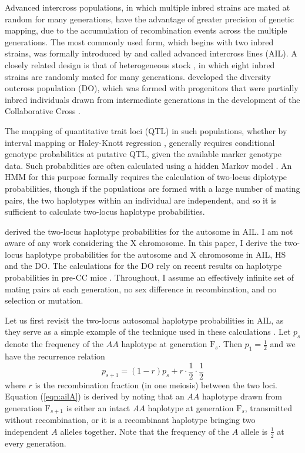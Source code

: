 \documentclass[12pt,letterpaper,pdftex]{article}
\begin{document}
\newpage

Advanced intercross populations, in which multiple inbred strains are
mated at random for many generations, have the advantage
of greater precision of genetic mapping, due to the
accumulation of recombination events across the multiple generations.
The most commonly used form, which
begins with two inbred strains, was formally introduced by
\citet{Darvasi1995} and called advanced intercross lines (AIL).  A
closely related design is that of heterogeneous stock \citep[HS;
see][]{Mott2000}, in which eight inbred strains are randomly mated
for many generations.  \citet{Svenson2012} developed
the diversity outcross population (DO), which was formed with
progenitors that were partially inbred individuals drawn from intermediate
generations in the development of the Collaborative Cross
\citep[so-called pre-CC mice; see][]{Aylor2011}.

The mapping of quantitative trait loci (QTL) in such populations,
whether by interval mapping \citep{Lander1989} or Haley-Knott
regression \citep{Haley1992}, generally requires conditional genotype
probabilities at putative QTL, given the available marker genotype
data. Such probabilities are often calculated using a hidden
Markov model \citep[HMM; see][App. D]{Broman2009}.  An HMM for this purpose
formally requires the calculation of two-locus diplotype probabilities, though
if the populations are formed with a large number of mating pairs, the
two haplotypes within an individual are independent, and so it is
sufficient to calculate two-locus haplotype probabilities.

\citet{Darvasi1995} derived the two-locus haplotype probabilities for
the autosome in
AIL.  I am not aware of any work considering the X chromosome.  In
this paper, I derive the two-locus haplotype probabilities for the
autosome and X chromosome in AIL, HS and the DO.  The calculations for
the DO rely on recent results on haplotype probabilities in pre-CC
mice \citep{Broman2012}.  Throughout, I assume an effectively
infinite set of mating pairs at each generation, no sex difference in
recombination, and no selection or mutation.

Let us first revisit the two-locus autosomal haplotype probabilities in
AIL, as they serve as a simple example of the technique used in these 
calculations 
\citep[see also][Ch. 3]{Bulmer1980}. Let $p_s$ denote the frequency of
the $AA$ haplotype at generation $\text{F}_s$.  Then $p_1 = \frac{1}{2}$ and
we have the recurrence relation
\begin{equation}
p_{s+1} = \textstyle{ (1-r) p_s + r \cdot \frac{1}{2} \cdot
  \frac{1}{2} }
\label{eqn:ailA}
\end{equation}
where $r$ is the recombination fraction (in one meiosis) between the
two loci.  Equation (\ref{eqn:ailA}) is derived by noting that 
an $AA$ haplotype drawn from generation $\text{F}_{s+1}$
is either an intact $AA$ haplotype at generation $\text{F}_s$,
transmitted without recombination, or it is a recombinant haplotype
bringing two independent $A$ alleles together.
Note that the frequency of the $A$ allele is $\frac{1}{2}$ at every
generation.  
\end{document}
